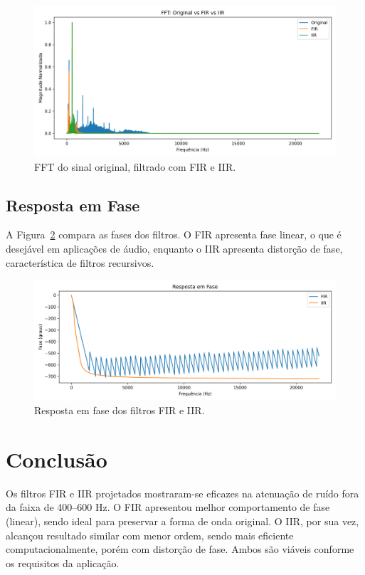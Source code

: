 \documentclass[a4paper,12pt]{article}
\begin{document}
	\begin{figure}[!htbp]
		\centering
		\includegraphics[width=\textwidth,height=0.8\textheight,keepaspectratio]{fft_comparacao.png}
		\caption{FFT do sinal original, filtrado com FIR e IIR.}
		\label{fig:fft_comparacao}
	\end{figure}
	
	\subsection{Resposta em Fase}
	A Figura~\ref{fig:fase_plot} compara as fases dos filtros. O FIR apresenta fase linear, o que é desejável em aplicações de áudio, enquanto o IIR apresenta distorção de fase, característica de filtros recursivos.
	
	\begin{figure}[!htbp]
		\centering
		\includegraphics[width=\textwidth,height=0.8\textheight,keepaspectratio]{fase_fir_iir.png}
		\caption{Resposta em fase dos filtros FIR e IIR.}
		\label{fig:fase_plot}
	\end{figure}
	
	\section{Conclusão}
	Os filtros FIR e IIR projetados mostraram-se eficazes na atenuação de ruído fora da faixa de 400–600 Hz. O FIR apresentou melhor comportamento de fase (linear), sendo ideal para preservar a forma de onda original. O IIR, por sua vez, alcançou resultado similar com menor ordem, sendo mais eficiente computacionalmente, porém com distorção de fase. Ambos são viáveis conforme os requisitos da aplicação.
	
	
	
\end{document}
